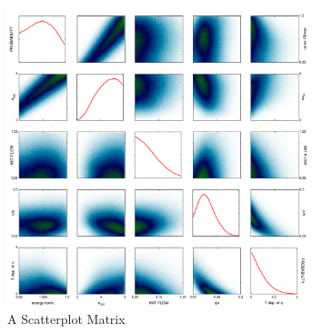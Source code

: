 \begin{figure}
\begin{center}
\includegraphics[width=0.8\textwidth]{figs/rhic.pdf}
\end{center}
\caption{\label{fig:scatterplot}
A Scatterplot Matrix }
\end{figure}



